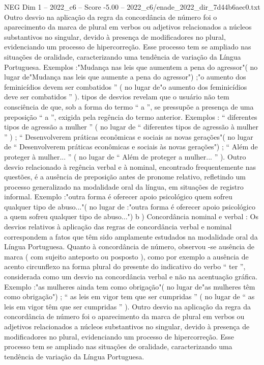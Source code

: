 \begin{textsample}{NEG Dim 1 – 2022\_c6 – Score -5.00 – 2022\_c6/enade\_2022\_dir\_7d44b6aec0.txt}
Outro desvio na aplicação da regra da concordância de número foi o aparecimento da marca de plural em verbos ou adjetivos relacionados a núcleos substantivos no singular, devido à presença de modificadores no plural, evidenciando um processo de hipercorreção.
Esse processo tem se ampliado nas situações de oralidade, caracterizando uma tendência de variação da Língua Portuguesa.
Exemplos :"Mudança nas leis que aumentem a pena do agressor"( no lugar de"Mudança nas leis que aumente a pena do agressor") ;"o aumento dos feminicídios devem ser combatidos ” ( no lugar de"o aumento dos feminicídios deve ser combatidos ” ). tipos de desvios revelam que o usuário não tem consciência de que, sob a forma do termo “ a ”, se pressupõe a presença de uma preposição “ a ”, exigida pela regência do termo anterior.
Exemplos : “ diferentes tipos de agressão a mulher ” ( no lugar de “ diferentes tipos de agressão à mulher ” ) ; “ Desenvolverem práticas econômicas e sociais as novas gerações"( no lugar de “ Desenvolverem práticas econômicas e sociais às novas gerações") ; “ Além de proteger à mulher... ” ( no lugar de “ Além de proteger a mulher... ” ).
Outro desvio relacionado à regência verbal e à nominal, encontrado frequentemente nas questões, é a ausência de preposição antes de pronome relativo, refletindo um processo generalizado na modalidade oral da língua, em situações de registro informal.
Exemplo :"outra forma é oferecer apoio psicológico quem sofreu qualquer tipo de abuso..."( no lugar de :"outra forma é oferecer apoio psicológico a quem sofreu qualquer tipo de abuso...") b ) Concordância nominal e verbal : Os desvios relativos à aplicação das regras de concordância verbal e nominal correspondem a fatos que têm sido amplamente estudados na modalidade oral da Língua Portuguesa.
Quanto à concordância de número, observou -se ausência de marca ( com sujeito anteposto ou posposto ), como por exemplo a ausência de acento circunflexo na forma plural do presente do indicativo do verbo “ ter ”, considerada como um desvio na concordância verbal e não na acentuação gráfica.
Exemplo :"as mulheres ainda tem como obrigação"( no lugar de"as mulheres têm como obrigação") ; “ as leis em vigor tem que ser cumpridas ” ( no lugar de “ as leis em vigor têm que ser cumpridas ” ).
Outro desvio na aplicação da regra da concordância de número foi o aparecimento da marca de plural em verbos ou adjetivos relacionados a núcleos substantivos no singular, devido à presença de modificadores no plural, evidenciando um processo de hipercorreção.
Esse processo tem se ampliado nas situações de oralidade, caracterizando uma tendência de variação da Língua Portuguesa.

\end{textsample}
